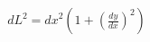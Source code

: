 \documentclass[preview]{standalone}
\begin{document}
\begin{align*}
{dL}^{2}={dx}^{2}(1+(\frac{dy}{dx})^{2})
\end{align*}
\end{document}
